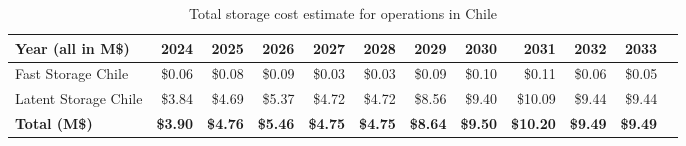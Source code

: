 \tiny \begin{longtable} { |p{}  |r  |r  |r  |r  |r  |r  |r  |r  |r  |r  |r |} 
\caption{Total storage cost estimate for operations in Chile \label{tab:opsStorageChile}}\\ 
\hline 
\textbf{Year (all in M\$)}&\textbf{2024}&\textbf{2025}&\textbf{2026}&\textbf{2027}&\textbf{2028}&\textbf{2029}&\textbf{2030}&\textbf{2031}&\textbf{2032}&\textbf{2033} \\ \hline
{Fast Storage Chile}&{\$0.06}&{\$0.08}&{\$0.09}&{\$0.03}&{\$0.03}&{\$0.09}&{\$0.10}&{\$0.11}&{\$0.06}&{\$0.05} \\ \hline
{Latent Storage Chile}&{\$3.84}&{\$4.69}&{\$5.37}&{\$4.72}&{\$4.72}&{\$8.56}&{\$9.40}&{\$10.09}&{\$9.44}&{\$9.44} \\ \hline
\textbf{Total (M\$)}&\textbf{\$3.90}&\textbf{\$4.76}&\textbf{\$5.46}&\textbf{\$4.75}&\textbf{\$4.75}&\textbf{\$8.64}&\textbf{\$9.50}&\textbf{\$10.20}&\textbf{\$9.49}&\textbf{\$9.49} \\ \hline
\end{longtable} \normalsize
